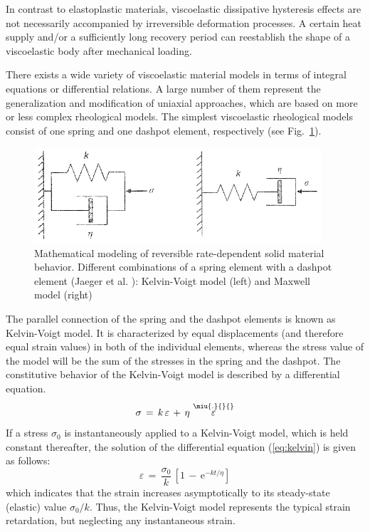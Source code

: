 In contrast to elastoplastic materials, viscoelastic dissipative hysteresis effects are not necessarily accompanied by irreversible
deformation processes. A certain heat supply and/or a sufficiently long recovery period can reestablish the shape of a viscoelastic body
after mechanical loading.

There exists a wide variety of viscoelastic material models in terms of integral equations or differential relations. A large number of
them represent the generalization and modification of uniaxial approaches, which are based on more or less complex rheological models. The
simplest viscoelastic rheological models consist of one spring and one dashpot element, respectively (see Fig.~\ref{fig:rheomod_vel}).
\begin{figure}[htb!]
\begin{center}
\footnotesize
\includegraphics[width=0.95\textwidth]{figures/rheomod_vel.eps}
\caption{Mathematical modeling of reversible rate-dependent solid material behavior. Different combinations of a spring element with a
dashpot element (Jaeger et al. \cite{JCZ:2007}): Kelvin-Voigt model (left) and Maxwell model (right)}
\label{fig:rheomod_vel}
\end{center}
\end{figure}

\newpage

The parallel connection of the spring and the dashpot elements is known as Kelvin-Voigt model. It is characterized by equal displacements
(and therefore equal strain values) in both of the individual elements, whereas the stress value of the model will be the sum of the
stresses in the spring and the dashpot. The constitutive behavior of the Kelvin-Voigt model is described by a differential equation.
\begin{equation}
\sigma\,=\,k\,\varepsilon\,+\,\eta\,\mathop{\varepsilon}\limits^{\miu{.}{}{}}
\label{eq:kelvin}
\end{equation}
If a stress $\sigma_0$ is instantaneously applied to a Kelvin-Voigt model, which is held constant thereafter, the solution of the
differential equation (\ref{eq:kelvin}) is given as follows:
\begin{equation}
\varepsilon\,=\,\frac{\sigma_0}{k}\,\left[1\,-\,\mathrm{e}^{-kt/\eta}\right]
\end{equation}
which indicates that the strain increases asymptotically to its steady-state (elastic) value $\sigma_0/k$. Thus, the Kelvin-Voigt model
represents the typical strain retardation, but neglecting any instantaneous strain.

